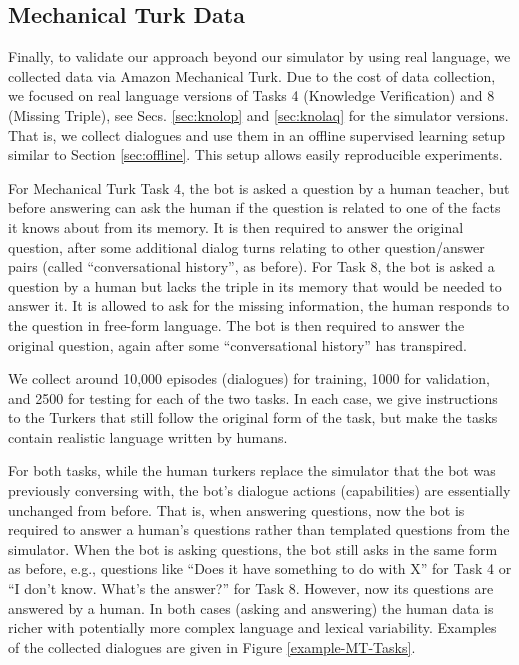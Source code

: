 \subsection{Mechanical Turk Data} \label{sec:mturk}

Finally, to validate our approach beyond our simulator by using real language, we collected
data via Amazon Mechanical Turk.
Due to the cost of data collection, we focused on real language versions of
Tasks 4 (Knowledge Verification) and 8 (Missing Triple), 
see Secs. \ref{sec:knolop} and \ref{sec:knolaq} for the simulator versions.
That is, we collect dialogues and use them in an offline supervised learning setup
similar to Section \ref{sec:offline}. This setup allows easily reproducible experiments.

For Mechanical Turk Task 4, the bot is asked a question by a human teacher,
but before answering can ask the human if the question is related
to one of the facts it knows about from its memory. It is then required to answer the original question,
 after some additional dialog turns relating to other question/answer pairs
(called ``conversational history'', as before).
For Task 8, the bot is asked a question by a human but lacks the triple in its memory that
would be needed to answer it. 
It is allowed to ask for the missing information, the human responds to the question in free-form language.
The bot is then required to answer the original question,
 again after some ``conversational history'' has transpired.

We collect around 10,000 episodes (dialogues) for training, 1000 for validation, 
and 2500 for testing for each of the two tasks. In each case, we give
 instructions to the Turkers that still follow the original form of the task, 
but make the tasks contain realistic language written by humans.

For both tasks, while the human turkers replace the simulator that the bot was previously conversing with,
the bot's dialogue actions (capabilities) are essentially unchanged from before. 
That is, when answering questions, now the bot is required to answer a human's questions
rather than templated questions from the simulator.
When the bot is asking questions,
the bot still asks in the same form as before, e.g., questions like
``Does it have something to do with X'' for Task 4
or ``I don't know. What's the answer?'' for Task 8. However,  now its questions are answered
by a human. In both cases (asking and answering) the human data is richer
with potentially more complex language and lexical variability. Examples
of the collected dialogues are given in Figure \ref{example-MT-Tasks}.


